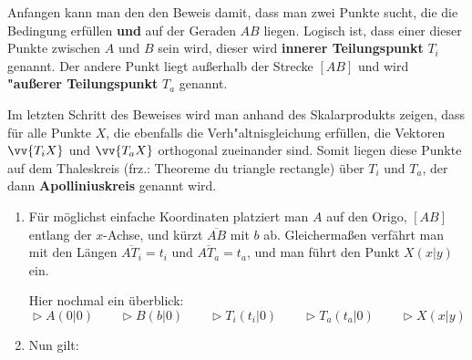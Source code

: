 \begin{small}
\begin{Beweis}
  Anfangen kann man den den Beweis damit, dass man zwei Punkte sucht, die die Bedingung erfüllen \textbf{und} auf der Geraden $AB$ liegen. Logisch ist, dass einer dieser Punkte zwischen $A$ und $B$ sein wird, dieser wird \textbf{innerer Teilungspunkt} $T_{i}$ genannt. Der andere Punkt liegt außerhalb der Strecke $[AB]$ und wird \textbf{"außerer Teilungspunkt} $T_{a}$ genannt. 

  Im letzten Schritt des Beweises wird man anhand des Skalarprodukts zeigen, dass für alle Punkte $X$, die ebenfalls die Verh"altnisgleichung erfüllen, die Vektoren $\vv{T_{i}X}$ und $\vv{T_{a}X}$ orthogonal zueinander sind. Somit liegen diese Punkte auf dem Thaleskreis (frz.: Theoreme du triangle rectangle) über $T_{i}$ und $T_{a}$, der dann \textbf{Apolliniuskreis} genannt wird.\\

  \begin{enumerate}
    \item
      Für möglichst einfache Koordinaten platziert man $A$ auf den Origo, $[AB]$ entlang der $x$-Achse, und kürzt $\overline{AB}$ mit $b$ ab. Gleichermaßen verfährt man mit den Längen $\overline{AT_{i}}=t_{i}$ und $\overline{AT_{a}}= t_{a}$, und man führt den Punkt $X(x|y)$ ein.

      Hier nochmal ein überblick:
      $$\vartriangleright A(0|0) \qquad \vartriangleright B(b|0) \qquad \vartriangleright T_{i}(t_{i}|0) \qquad \vartriangleright T_{a}(t_{a}|0) \qquad \vartriangleright X(x|y)$$

    \item
      Nun gilt:
      

\end{enumerate}
\end{Beweis}
\end{small}
